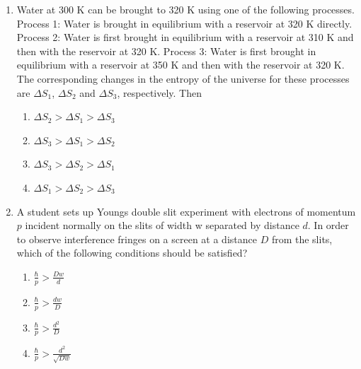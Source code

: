 \documentclass[journal,12pt,onecolumn]{IEEEtran}
\theoremstyle{remark}
\begin{document}
\begin{enumerate}
\item
Water at 300 K can be brought to 320 K using one of the following processes.
Process 1: Water is brought in equilibrium with a reservoir at 320 K directly.
Process 2: Water is first brought in equilibrium with a reservoir at 310 K and then with the reservoir at 320 K.
Process 3: Water is first brought in equilibrium with a reservoir at 350 K and then with the reservoir at 320 K.
The corresponding changes in the entropy of the universe for these processes are $\Delta S_1$, $\Delta S_2$ and $\Delta S_3$, respectively. Then
\begin{enumerate}
    \item $\Delta S_2 > \Delta S_1 > \Delta S_3$
    \item $\Delta S_3 > \Delta S_1 > \Delta S_2$
    \item $\Delta S_3 > \Delta S_2 > \Delta S_1$
    \item $\Delta S_1 > \Delta S_2 > \Delta S_3$
\end{enumerate}


\item
A student sets up Young\textquotesingle s double slit experiment with electrons of momentum $p$ incident normally on the slits of width w separated by distance $d$. In order to observe interference fringes on a screen at a distance $D$ from the slits, which of the following conditions should be satisfied?
\begin{enumerate}
    \item $\frac{\hbar}{p} > \frac{Dw}{d}$
    \item $\frac{\hbar}{p} > \frac{dw}{D}$
    \item $\frac{\hbar}{p} > \frac{d^2}{D}$
    \item $\frac{\hbar}{p} > \frac{d^2}{\sqrt{Dw}}$
\end{enumerate}



\end{enumerate}
\end{document}

